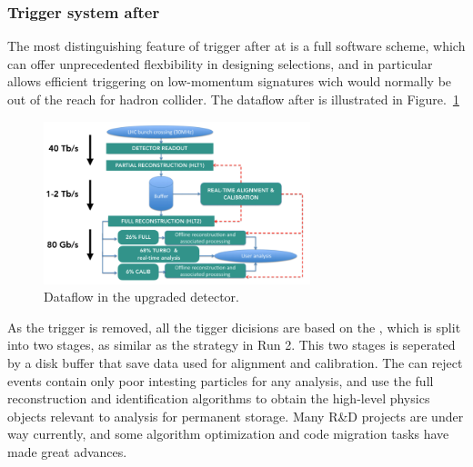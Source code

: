 \subsubsection{Trigger system after \upgradeone}

The most distinguishing feature of trigger after \upgradeone at \lhcb is a full software scheme,
which can offer unprecedented flexbibility in designing selections, 
and in particular allows efficient triggering on low-momentum signatures wich would normally be out of the reach for hadron collider.
The dataflow after \upgradeone is illustrated in Figure.~\ref{fig:Hlt_upgrade}

\begin{figure}[!hbtp]
\centering
\includegraphics[width=0.69\textwidth]{Figures/02_Detector/upgrade_trigger}%
\caption{Dataflow in the upgraded \lhcb detector\supercite{LHCb-TDR-021}.}
\label{fig:Hlt_upgrade}
\end{figure}


As the \lone trigger is removed,
all the tigger dicisions are based on the \hlt,
which is split into two stages, 
as similar as the strategy in Run 2.
This two stages is seperated by a disk buffer that save data used for alignment and calibration.
The \hltone can reject events contain only poor intesting particles for any \lhcb analysis,
and \hlttwo use the full reconstruction and identification algorithms to obtain the high-level physics objects relevant to analysis for permanent storage.
Many R\&D projects are under way currently,
and some algorithm optimization and code migration tasks have made great advances\supercite{LHCb-TDR-021,LHCb-TDR-018,LHCb-TDR-017,LHCb-TDR-016}.























